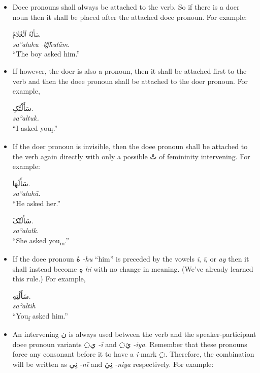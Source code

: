 \documentclass[
  10pt,
]{book}
\begin{document}
\begin{itemize}
\item
  Doee pronouns shall always be attached to the verb. So if there is a doer noun then it shall be placed after the attached doee pronoun. For example:

  \foreignlanguage{arabic}{سَأَلَهُ ٱلْغُلَامُ.}\\
  \emph{saʾalahu -lg͡hulām.}\\
  \enquote{The boy asked him.}
\item
  If however, the doer is also a pronoun, then it shall be attached first to the verb and then the doee pronoun shall be attached to the doer pronoun. For example,

  \foreignlanguage{arabic}{سَأَلْتُکِ.}\\
  \emph{saʾaltuk.}\\
  \enquote{I asked you\textsubscript{f}.}
\item
  If the doer pronoun is invisible, then the doee pronoun shall be attached to the verb again directly with only a possible \foreignlanguage{arabic}{تْ} of femininity intervening. For example:

  \foreignlanguage{arabic}{سَأَلَهَا.}\\
  \emph{saʾalahā.}\\
  \enquote{He asked her.}

  \foreignlanguage{arabic}{سَأَلَتْکَ.}\\
  \emph{saʾalatk.}\\
  \enquote{She asked you\textsubscript{m}.}
\item
  If the doee pronoun \foreignlanguage{arabic}{هُ} \emph{-hu} \enquote{him} is preceded by the vowels \emph{i}, \emph{ī}, or \emph{ay} then it shall instead become \foreignlanguage{arabic}{هِ} \emph{hi} with no change in meaning. (We've already learned this rule.) For example,

  \foreignlanguage{arabic}{سَأَلْتِهِ.}\\
  \emph{saʾaltih}\\
  \enquote{You\textsubscript{f} asked him.}
\item
  An intervening \foreignlanguage{arabic}{ن} is always used between the verb and the speaker-participant doee pronoun variants \foreignlanguage{arabic}{◌ِي} \emph{-ī} and \foreignlanguage{arabic}{◌ِيَ} \emph{-iya}. Remember that these pronouns force any consonant before it to have a \emph{i}-mark \foreignlanguage{arabic}{◌ِ}. Therefore, the combination will be written as \foreignlanguage{arabic}{نِي} \emph{-nī} and \foreignlanguage{arabic}{نِيَ} \emph{-niya} respectively. For example:


\end{itemize}
\end{document}
